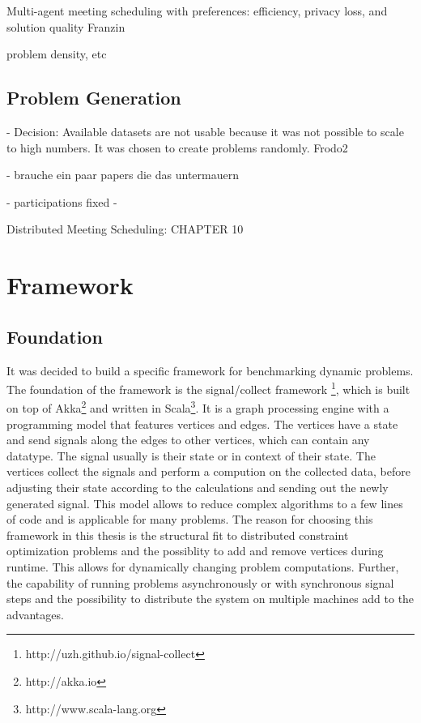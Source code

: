 Multi-agent meeting scheduling with preferences:
efficiency, privacy loss, and solution quality Franzin

problem density, etc

\subsection{Problem Generation}

- Decision: Available datasets are not usable because it was not possible to scale to high numbers. It was chosen to create problems randomly.
Frodo2

- brauche ein paar papers die das untermauern

- participations fixed
- 

Distributed Meeting Scheduling: CHAPTER 10

\section{Framework}

\subsection{Foundation}

It was decided to build a specific framework for benchmarking dynamic problems. The foundation of the framework is the signal/collect framework \cite{Stutz2010}\footnote{http://uzh.github.io/signal-collect}, which is built on top of Akka\footnote{http://akka.io} and written in Scala\footnote{http://www.scala-lang.org}. It is a graph processing engine with a programming model that features vertices and edges. The vertices have a state and send signals along the edges to other vertices, which can contain any datatype. The signal usually is their state or in context of their state. The vertices collect the signals and perform a compution on the collected data, before adjusting their state according to the calculations and sending out the newly generated signal.  This model allows to reduce complex algorithms to a few lines of code and is applicable for many problems.\newline\newline
The reason for choosing this framework in this thesis is the structural fit to distributed constraint optimization problems and the possiblity to add and remove vertices during runtime. This allows for dynamically changing problem computations. Further, the capability of running problems asynchronously or with synchronous signal steps and the possibility to distribute the system on multiple machines add to the advantages.

